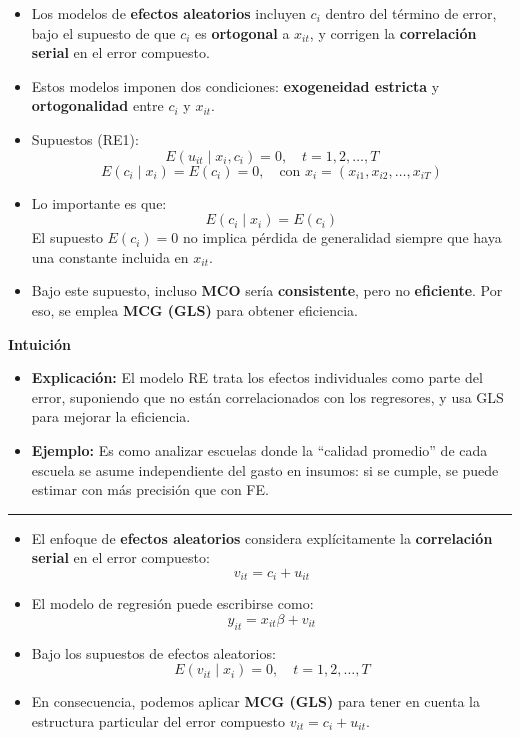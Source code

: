\documentclass[12pt]{article}
\begin{document}
\begin{itemize}
    \item Los modelos de \textbf{efectos aleatorios} incluyen $c_i$ dentro del término de error, bajo el supuesto de que $c_i$ es \textbf{ortogonal} a $x_{it}$, y corrigen la \textbf{correlación serial} en el error compuesto.
    
    \item Estos modelos imponen dos condiciones: \textbf{exogeneidad estricta} y \textbf{ortogonalidad} entre $c_i$ y $x_{it}$.
    
    \item Supuestos (RE1):
    \[
    E(u_{it} \mid x_i, c_i) = 0, \quad t=1,2,\ldots,T
    \]
    \[
    E(c_i \mid x_i) = E(c_i) = 0, \quad \text{con } x_i = (x_{i1}, x_{i2}, \ldots, x_{iT})
    \]
    
    \item Lo importante es que:
    \[
    E(c_i \mid x_i) = E(c_i)
    \]
    El supuesto $E(c_i)=0$ no implica pérdida de generalidad siempre que haya una constante incluida en $x_{it}$.
    
    \item Bajo este supuesto, incluso \textbf{MCO} sería \textbf{consistente}, pero no \textbf{eficiente}.  
    Por eso, se emplea \textbf{MCG (GLS)} para obtener eficiencia.
\end{itemize}

\noindent\textbf{Intuición}
\begin{itemize}
    \item \textbf{Explicación:} El modelo RE trata los efectos individuales como parte del error, suponiendo que no están correlacionados con los regresores, y usa GLS para mejorar la eficiencia.
    \item \textbf{Ejemplo:} Es como analizar escuelas donde la “calidad promedio” de cada escuela se asume independiente del gasto en insumos: si se cumple, se puede estimar con más precisión que con FE.
\end{itemize}

\hrule

\begin{itemize}
    \item El enfoque de \textbf{efectos aleatorios} considera explícitamente la \textbf{correlación serial} en el error compuesto:
    \[
    v_{it} = c_i + u_{it}
    \]
    
    \item El modelo de regresión puede escribirse como:
    \[
    y_{it} = x_{it}\beta + v_{it}
    \]
    
    \item Bajo los supuestos de efectos aleatorios:
    \[
    E(v_{it} \mid x_i) = 0, \quad t=1,2,\ldots,T
    \]
    
    \item En consecuencia, podemos aplicar \textbf{MCG (GLS)} para tener en cuenta la estructura particular del error compuesto $v_{it} = c_i + u_{it}$.
\end{itemize}
\end{document}
